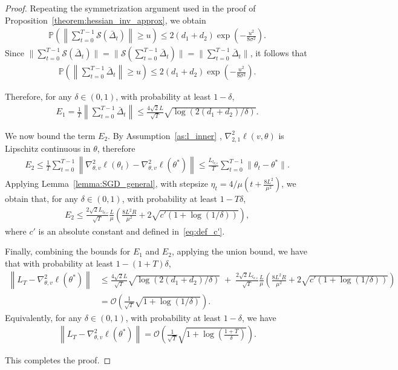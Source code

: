 \documentclass[11 pt]{article}
\begin{document}
\begin{proof}
Repeating the symmetrization argument used in the proof of Proposition~\ref{theorem:hessian_inv_approx}, we obtain
\begin{align*}
    \mathbb{P}\left( \left\| \sum_{t=0}^{T-1}\mathscr{S}(\bar{\Delta}_t) \right\|\geq u\right)\leq 2(d_1+d_2) \exp\left(-\frac{u^2}{8\sigma^2}\right).
\end{align*}
Since $\| \sum_{t=0}^{T-1}\mathscr{S}(\bar{\Delta}_t)\|=\|\mathscr{S}(\sum_{t=0}^{T-1}\bar{\Delta}_t)\|=\|\sum_{t=0}^{T-1} \bar{\Delta}_t\|$, it follows that
\begin{align*}
    \mathbb{P}\left( \left\| \sum_{t=0}^{T-1}\bar{\Delta}_t \right\|\geq u\right)\leq 2(d_1+d_2) \exp\left(-\frac{u^2}{8\sigma^2}\right).
\end{align*}

Therefore, for any $\delta\in(0,1)$, with probability at least $1-\delta$, 
\begin{align*}
E_1=\frac1T\left\|\sum_{t=0}^{T-1}\bar{\Delta}_t\right\| \leq \frac{4\sqrt{2}L}{\sqrt{T}} \sqrt{\log\left(2(d_1+d_2)/\delta\right)}.
\end{align*}

We now bound the term $E_2$. By Assumption~\ref{as:l_inner} , ${\nabla}^2_{2,1}\ell(v,\theta)$ is Lipschitz continuous in $\theta$, therefore 
\begin{align*}
E_2\leq\frac{1}{T}\sum_{t=0}^{T-1}\left\| \nabla_{\theta,v}^2\ell(\theta_t)-\nabla_{\theta,v}^2\ell(\theta^*) \right\|
\leq \frac{L_{l_{\theta,v}}}{T}\sum_{t=0}^{T-1}\|\theta_{t}-\theta^*\|.
\end{align*}
Applying Lemma~\ref{lemma:SGD_general}, with stepsize $\eta_t=4/{\mu(t+\frac{8L^2}{\mu^2})}$, we obtain that, for any $\delta\in(0,1)$, with probability at least $1-T\delta$,
\begin{align*}
    E_2\leq \frac{2\sqrt2L_{l_{\theta,v}}}{\sqrt{T}}\frac{L}{\mu}\left(\frac{8L^2R}{\mu^2}+2\sqrt{c'(1+\log(1/\delta))}\right), 
\end{align*}
where $c'$ is an absolute constant and defined in~\eqref{eq:def_c'}.   


Finally, combining the bounds for $E_1$ and $E_2$,  applying the union bound, we have that with probability at least $1-(1+T)\delta$, 
\begin{align*}
        \left\|L_T - \nabla_{\theta,v}^2\ell( \theta^*) \right\|
        & \leq \frac{4\sqrt{2}L}{\sqrt{T}}\sqrt{\log(2(d_1+d_2)/\delta)} \;+\; \frac{2\sqrt2L_{l_{\theta,v}}}{\sqrt{T}}\frac{L}{\mu}\left(\frac{8L^2R}{\mu^2}+2\sqrt{c'(1+\log(1/\delta))}\right) \\
        &= \mathcal{O}(\frac{1}{\sqrt{T}}\sqrt{1+\log(1/\delta)}).
\end{align*} 
Equivalently, for any $\delta \in (0,1)$, with probability at least $1-\delta$, we have
\begin{align*}
    \left\|L_T - \nabla_{\theta,v}^2\ell( \theta^*) \right\| = \mathcal{O}\left(\frac{1}{\sqrt{T}}\sqrt{1+\log\left(\frac{1+T}{\delta}\right)}\right).
\end{align*}

This completes the proof.
\end{proof}
\end{document}
